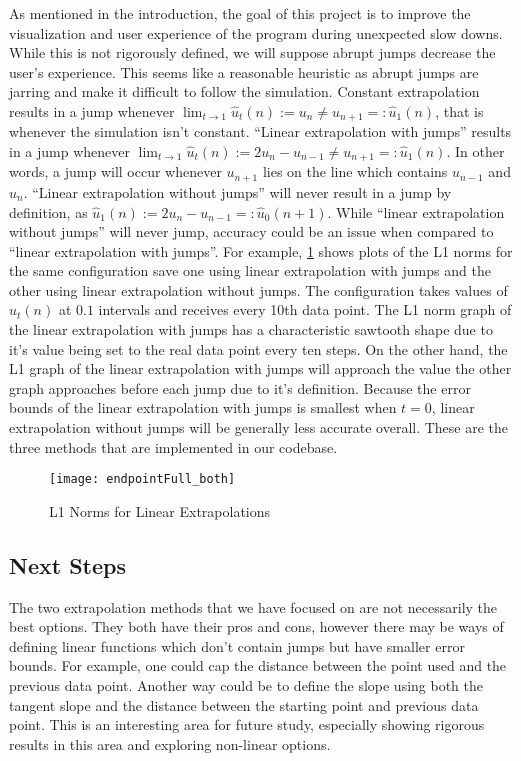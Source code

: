 As mentioned in the introduction, the goal of this project is to improve the visualization and user experience of the program during unexpected slow downs.
While this is not rigorously defined, we will suppose abrupt jumps decrease the user's experience.
This seems like a reasonable heuristic as abrupt jumps are jarring and make it difficult to follow the simulation.
Constant extrapolation results in a jump whenever $\lim_{t\to1}\hat{u}_t(n) := u_n \not= u_{n+1} =: \hat{u}_1(n)$, that is whenever the simulation isn't constant.
``Linear extrapolation with jumps'' results in a jump whenever $\lim_{t\to1}\hat{u}_t(n) := 2u_n - u_{n-1} \not= u_{n+1} =: \hat{u}_1(n)$.
In other words, a jump will occur whenever $u_{n+1}$ lies on the line which contains $u_{n-1}$ and $u_n$.
``Linear extrapolation without jumps'' will never result in a jump by definition, as $\hat{u}_1(n) := 2u_n - u_{n-1} =: \hat{u}_0(n+1)$.
While ``linear extrapolation without jumps'' will never jump, accuracy could be an issue when compared to ``linear extrapolation with jumps''.
For example, \cref{fig:l1} shows plots of the L1 norms for the same configuration save one using linear extrapolation with jumps and the other using linear extrapolation without jumps.
The configuration takes values of $\hat{u}_t(n)$ at $0.1$ intervals and receives every 10th data point.
The L1 norm graph of the linear extrapolation with jumps has a characteristic sawtooth shape due to it's value being set to the real data point every ten steps.
On the other hand, the L1 graph of the linear extrapolation with jumps will approach the value the other graph approaches before each jump due to it's definition.
Because the error bounds of the linear extrapolation with jumps is smallest when $t=0$, linear extrapolation without jumps will be generally less accurate overall.
These are the three methods that are implemented in our codebase.

\begin{figure}[H]
    \centering
    \texttt{[image: endpointFull\_both]}
    \caption{L1 Norms for Linear Extrapolations}%
    \label{fig:l1}
\end{figure}


\subsection{Next Steps}%
\label{sub:next_steps}

The two extrapolation methods that we have focused on are not necessarily the best options.
They both have their pros and cons, however there may be ways of defining linear functions which don't contain jumps but have smaller error bounds.
For example, one could cap the distance between the point used and the previous data point.
Another way could be to define the slope using both the tangent slope and the distance between the starting point and previous data point.
This is an interesting area for future study, especially showing rigorous results in this area and exploring non-linear options.
